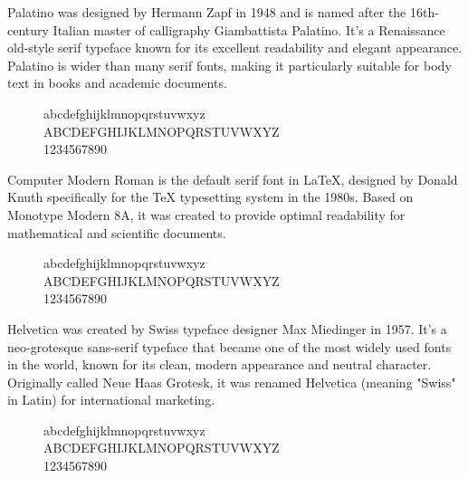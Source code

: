  \begin{example}[Palatino]
    \label{ex:palatino}
    Palatino was designed by Hermann Zapf in 1948 and is named after the 16th-century Italian master of calligraphy Giambattista Palatino. It's a Renaissance old-style serif typeface known for its excellent readability and elegant appearance. Palatino is wider than many serif fonts, making it particularly suitable for body text in books and academic documents. 
    
    \begin{figure}[H]
      \selectfont
      \huge
      \raggedright
      abcdefghijklmnopqrstuvwxyz \\
      ABCDEFGHIJKLMNOPQRSTUVWXYZ \\
      1234567890
    \end{figure}
  \end{example}

  \begin{example}
    \label{ex:computer-modern-roman}
    Computer Modern Roman is the default serif font in LaTeX, designed by Donald Knuth specifically for the TeX typesetting system in the 1980s. Based on Monotype Modern 8A, it was created to provide optimal readability for mathematical and scientific documents. 
    
    \begin{figure}[H]
      \huge
      \raggedright
      abcdefghijklmnopqrstuvwxyz \\
      ABCDEFGHIJKLMNOPQRSTUVWXYZ \\
      1234567890
    \end{figure}
  \end{example}

  \begin{example}[Helvetica]
    \label{ex:helvetica}
    Helvetica was created by Swiss typeface designer Max Miedinger in 1957. It's a neo-grotesque sans-serif typeface that became one of the most widely used fonts in the world, known for its clean, modern appearance and neutral character. Originally called Neue Haas Grotesk, it was renamed Helvetica (meaning "Swiss" in Latin) for international marketing. 
    
    \begin{figure}[H]
      \selectfont 
      \huge
      \raggedright
      abcdefghijklmnopqrstuvwxyz \\
      ABCDEFGHIJKLMNOPQRSTUVWXYZ \\
      1234567890
    \end{figure}
  \end{example}

